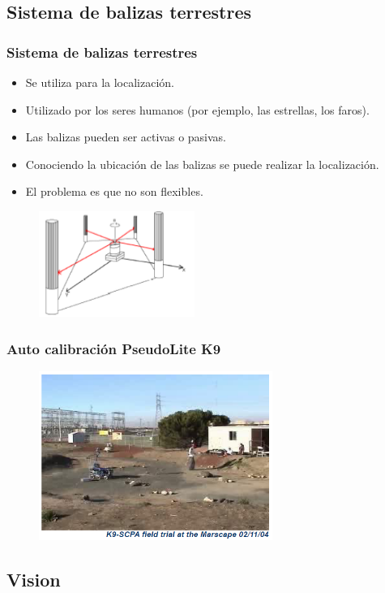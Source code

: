 \documentclass{beamer}
\begin{document}
\subsection{Sistema de balizas terrestres}

\begin{frame}
\frametitle{Sistema de balizas terrestres}
\begin{itemize}
\item Se utiliza para la localización.
\item Utilizado por los seres humanos (por ejemplo, las estrellas, los faros).
\item Las balizas pueden ser activas o pasivas.
\item Conociendo la ubicación de las balizas se puede realizar la localización.
\item El problema es que no son flexibles.
\end{itemize}
\begin{figure}[!h]
\centering
\includegraphics[width=2in]{Balizas}
\end{figure}
\end{frame}

\begin{frame}
\frametitle{Auto calibración PseudoLite K9}
\begin{figure}[!h]
\centering
\includegraphics[width=3in]{Self}
\end{figure}
\end{frame}

\subsection{Vision}
\end{document}
